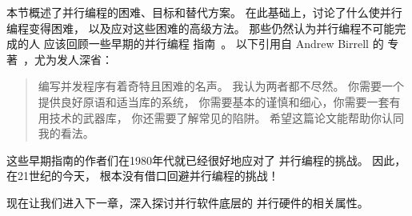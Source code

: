 本节概述了并行编程的困难、目标和替代方案。
在此基础上，讨论了什么使并行编程变得困难，
以及应对这些困难的高级方法。
那些仍然认为并行编程不可能完成的人
应该回顾一些早期的并行编程
指南~\cite{SQNTParallel,AndrewDBirrell1989Threads,Beck85,Inman85}。
以下引用自 Andrew Birrell 的
专著~\cite{AndrewDBirrell1989Threads}，尤为发人深省：

\begin{quote}
	编写并发程序有着奇特且困难的名声。
	我认为两者都不尽然。
	你需要一个提供良好原语和适当库的系统，
	你需要基本的谨慎和细心，你需要一套有用技术的武器库，
	你还需要了解常见的陷阱。
	希望这篇论文能帮助你认同我的看法。
\end{quote}

这些早期指南的作者们在1980年代就已经很好地应对了
并行编程的挑战。
因此，在21世纪的今天，
根本没有借口回避并行编程的挑战！

现在让我们进入下一章，深入探讨并行软件底层的
并行硬件的相关属性。

